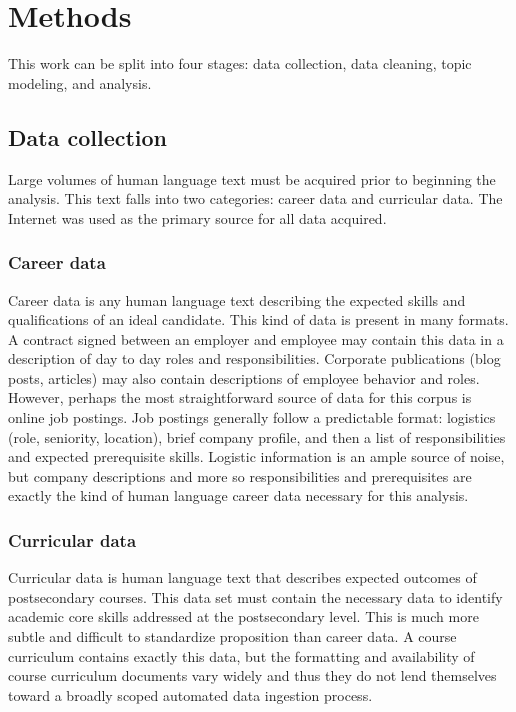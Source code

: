 \section{Methods}

This work can be split into four stages: data collection, data cleaning, topic modeling, and analysis.

\subsection{Data collection}

Large volumes of human language text must be acquired prior to beginning the analysis.
This text falls into two categories: career data and curricular data.
The Internet was used as the primary source for all data acquired.

\subsubsection{Career data}

Career data is any human language text describing the expected skills and qualifications of an ideal candidate.
This kind of data is present in many formats.
A contract signed between an employer and employee may contain this data in a description of day to day roles and responsibilities.
Corporate publications (blog posts, articles) may also contain descriptions of employee behavior and roles.
However, perhaps the most straightforward source of data for this corpus is online job postings.
Job postings generally follow a predictable format: logistics (role, seniority, location), brief company profile, and then a list of responsibilities and expected prerequisite skills.
Logistic information is an ample source of noise, but company descriptions and more so responsibilities and prerequisites are exactly the kind of human language career data necessary for this analysis.



\subsubsection{Curricular data}

Curricular data is human language text that describes expected outcomes of postsecondary courses.
This data set must contain the necessary data to identify academic core skills addressed at the postsecondary level.
This is much more subtle and difficult to standardize proposition than career data.
A course curriculum contains exactly this data, but the formatting and availability of course curriculum documents vary widely and thus they do not lend themselves toward a broadly scoped automated data ingestion process.

